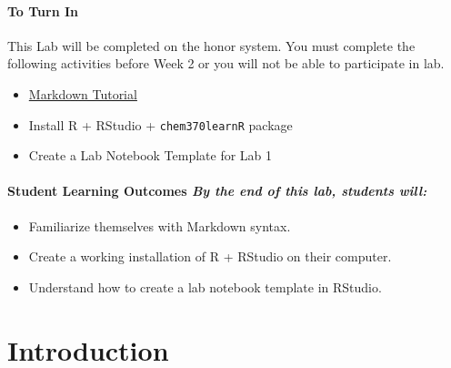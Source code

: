 \documentclass[]{tufte-book}
\providecommand{\tightlist}{%
  \setlength{\itemsep}{0pt}\setlength{\parskip}{0pt}}
\begin{document}
\hypertarget{to-turn-in}{%
\paragraph{\texorpdfstring{\textbf{To Turn In}}{To Turn In}}\label{to-turn-in}}

This Lab will be completed on the honor system. You must complete the following activities before Week 2 or you will not be able to participate in lab.

\begin{itemize}
\tightlist
\item
  \href{https://www.markdowntutorial.com/}{Markdown Tutorial}
\item
  Install R + RStudio + \texttt{chem370learnR} package
\item
  Create a Lab Notebook Template for Lab 1
\end{itemize}

\hypertarget{student-learning-outcomes-by-the-end-of-this-lab-students-will}{%
\paragraph{\texorpdfstring{\textbf{Student Learning Outcomes} \textbar{} \emph{By the end of this lab, students will:}}{Student Learning Outcomes \textbar{} By the end of this lab, students will:}}\label{student-learning-outcomes-by-the-end-of-this-lab-students-will}}

\begin{itemize}
\tightlist
\item
  Familiarize themselves with Markdown syntax.
\item
  Create a working installation of R + RStudio on their computer.
\item
  Understand how to create a lab notebook template in RStudio.
\end{itemize}

\hypertarget{r-intro}{%
\section*{Introduction}\label{r-intro}}
\end{document}
